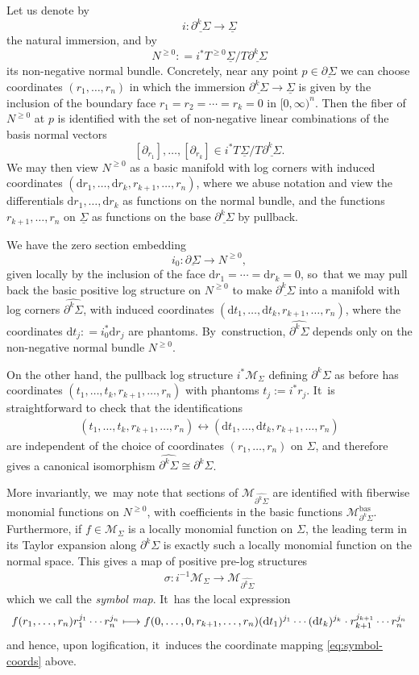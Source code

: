 \documentclass[JEP,XML,SOM,Unicode,NoFloatCountersInSection,published]{cedram}
\newcommand\mto{\mathchoice{\longmapsto}{\mapsto}{\mapsto}{\mapsto}}
\theoremstyle{definition}
\theoremstyle{remark}
\let\defn\emph
\renewcommand{\ge}{\geqslant}
\newcommand{\defas}{\mathrel{\mathop:}=}
\newcommand{\cM}{\mathscr{M}}
\newcommand{\cMbas}{\mathscr{M}^{\mathrm{bas}}}
\newcommand{\dd}{\mathrm{d}}
\newcommand{\cvf}[1]{\partial_{#1}}
\newcommand{\Sig}{\Sigma}
\newcommand{\uSig}{\underline{\Sigma}}
\newcommand{\ubdSig}[1][]{\underline{\partial^{#1}\Sigma}}
\newcommand{\bdSig}[1][]{\partial^{#1}\Sigma}
\newcommand{\tb}[2][]{T_{#1}#2}
\newcommand{\tbge}[2][]{T^{\ge0}_{#1}#2}
\begin{document}
Let us denote by
\[
i \colon \ubdSig[k] \to \uSig
\]
the natural immersion, and by
\[
N^{\ge0} \defas i^*\tbge{\uSig}/\tb{\ubdSig[k]}
\]
its non-negative normal bundle. Concretely, near any point $p \in \ubdSig$ we can choose coordinates $(r_1,\ldots,r_n)$ in which the immersion $\ubdSig[k] \to \uSig$ is given by the inclusion of the boundary face $r_1=r_2=\cdots=r_k=0$ in $[0,\infty)^n$. Then the fiber of $N^{\ge0}$ at $p$ is identified with the set of non-negative linear combinations of the basis normal vectors
\[
[\cvf{r_1}],\ldots,[\cvf{r_k}] \in i^*\tb{\uSig}/\tb{\ubdSig[k]}.
\]
We may then view $N^{\ge 0}$ as a basic manifold with log corners with induced coordinates $(\dd r_1,\ldots, \dd r_k, r_{k+1},\ldots,r_{n})$,
where we abuse notation and view the differentials $\dd r_1,\ldots,\dd r_k$ as functions on the normal bundle, and the functions $r_{k+1},\ldots, r_n$ on $\uSig$ as functions on the base $\ubdSig[k]$ by pullback.

We have the zero section embedding
\[
i_0 : \ubdSig \to N^{\ge 0},
\]
given locally by the inclusion of the face $\dd r_1=\cdots = \dd r_k = 0$, so~that we may pull back the basic positive log structure on $N^{\ge 0}$ to make $\ubdSig[k]$ into a manifold with log corners $\widehat{\bdSig[k]}$, with induced coordinates $(\dd t_1,\ldots, \dd t_k,r_{k+1},\ldots, r_n)$, where the coordinates $\dd t_j \defas i_0^* \dd r_j$ are phantoms. By~construction, $\widehat{\bdSig[k]}$ depends only on the non-negative normal bundle $N^{\ge0}$.

On the other hand, the pullback log structure $i^*\cM_{\Sig}$ defining $\bdSig[k]$ as before has coordinates $(t_1,\ldots,t_k,r_{k+1},\ldots,r_n)$ with phantoms $t_j := i^* r_j$. It~is straightforward to check that the identifications
\begin{align}(t_1,\ldots,t_k,r_{k+1},\ldots,r_n)\longleftrightarrow
(\dd t_1,\ldots, \dd t_k,r_{k+1},\ldots,r_n) \label{eq:symbol-coords}
\end{align}
are independent of the choice of coordinates $(r_1,\ldots,r_n)$ on $\Sig$, and therefore gives a canonical isomorphism $\widehat{\bdSig[k]} \cong \bdSig[k]$.

More invariantly, we~may note that sections of $\cM_{\widehat{\bdSig[k]}}$ are identified with fiberwise monomial functions on $N^{\ge0}$, with coefficients in the basic functions $\cMbas_{\bdSig[k]}$. Furthermore, if $f \in \cM_{\Sig}$ is a locally monomial function on $\Sig$, the leading term in its Taylor expansion along $\bdSig[k]$ is exactly such a locally monomial function on the normal space. This gives a map of positive pre-log structures
\begin{align}
\sigma \colon
i^{-1} \cM_{\Sig} \to \cM_{\widehat{\bdSig[k]}} \label{eq:symbol-map}
\end{align}
which we call the \defn{symbol map}. It~has the local expression
\[
f(r_1,\ldots,r_n)r_1^{j_1}\cdots r_n^{j_n} \mto f(0,\ldots,0,r_{k+1},\ldots,r_n) (\dd t_1)^{j_1} \cdots (\dd t_k)^{j_k} \cdot r_{k+1}^{j_{k+1}}\cdots r_n^{j_n}
\]
and hence, upon logification, it~induces the coordinate mapping \eqref{eq:symbol-coords} above.
\end{document}

